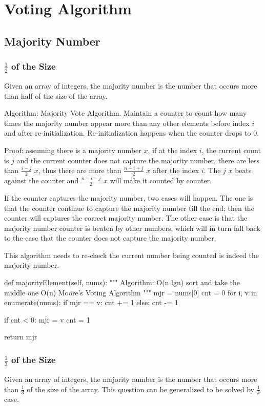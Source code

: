 \section{Voting Algorithm}
\subsection{Majority Number}
\subsubsection{$\frac{1}{2}$ of the Size}
Given an array of integers, the majority number is the number that occurs more than half of the size of the array. 

Algorithm: Majority Vote Algorithm. Maintain a counter to count how many times the majority number appear more than any other elements before index $i$ and after re-initialization. Re-initialization happens when the counter drops to 0. 

Proof: assuming there is a majority number $x$, if at the index $i$, the current count is $j$ and the current counter does not capture the majority number, there are less than $\frac{i-j}{2}$ $x$, thus there are more than $\frac{n-i+j}{2}$ $x$ after the index $i$. The $j$ $x$ beats against the counter and $\frac{n-i-j}{2}$ $x$ will make it counted by counter. 

If the counter captures the majority number, two cases will happen. The one is that the counter continue to capture the majority number till the end; then the counter will captures the correct majority number. The other case is that the majority number counter is beaten by other numbers, which will in turn fall back to the case that the counter does not capture the majority number.
 
This algorithm needs to re-check the current number being counted is indeed the majority number.    

\begin{python}
def majorityElement(self, nums):
    """
    Algorithm:
    O(n lgn) sort and take the middle one
    O(n) Moore's Voting Algorithm
    """
    mjr = nums[0]
    cnt = 0
    for i, v in enumerate(nums):
        if mjr == v:
            cnt += 1
        else:
            cnt -= 1

        if cnt < 0:
            mjr = v
            cnt = 1

    return mjr

\end{python}
\subsubsection{$\frac{1}{3}$ of the Size}
Given an array of integers, the majority number is the number that occurs more than $\frac{1}{3}$ of the size of the array. This question can be generalized to be solved by $\frac{1}{k}$ case. 

